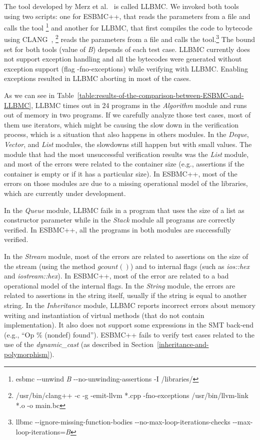 \documentclass[conference]{IEEEtran}
\begin{document}
The tool developed by Merz et al.~\cite{Florian12} is called LLBMC.
We invoked both tools using two scripts: one for ESBMC++, that reads
the parameters from a file and calls the tool%
\footnote[1]{esbmc -\/-unwind \textit{B}  -\/-no-unwinding-assertions -I /libraries/}
and another for LLBMC, that first compiles the code to bytecode using CLANG~\cite{CLANG},%
\footnote[2]{/usr/bin/clang++ -c -g -emit-llvm *.cpp -fno-exceptions \newline /usr/bin/llvm-link *.o -o main.bc}
reads the parameters from a file and calls the tool.\footnote[3]
{llbmc -\/-ignore-missing-function-bodies \newline -\/-no-max-loop-iterations-checks -\/-max-loop-iterations=\textit{B}}
The bound set for both tools (value of \textit{B}) depends of each test case.
LLBMC currently does not support exception handling and all the bytecodes were generated without
exception support (flag -fno-exceptions) while verifying with LLBMC.
Enabling exceptions resulted in LLBMC aborting in most of the cases.

As we can see in Table~\ref{table:results-of-the-comparison-between-ESBMC-and-LLBMC},
LLBMC times out in 24 programs in the \textit{Algorithm} module and
runs out of memory in two programs. If we carefully analyze those test cases,
most of them use iterators, which might be causing the slow down
in the verification process, which is a situation that also happens in others modules.
In the \textit{Deque}, \textit{Vector}, and \textit{List} modules,
the slowdowns still happen but with small values. The module that had the
most unsuccessful verification results was the \textit{List} module, and most of the
errors were related to the container size (e.g., assertions if the container
is empty or if it has a particular size). In ESBMC++, most of the errors on
those modules are due to a missing operational model
of the libraries, which are currently under development.

In the \textit{Queue} module, LLBMC fails in a program that uses the size of a list
as constructor parameter while in the \textit{Stack} module all programs are correctly verified.
In ESBMC++, all the programs in both modules are successfully verified.

In the \textit{Stream} module, most of the errors are related to assertions on the size
of the stream (using the method $gcount\left(\right)$) and to internal flags (such as
\textit{ios::hex} and \textit{iostream::hex}). In ESBMC++, most of the error are related
to a bad operational model of the internal flags. In the \textit{String} module, the errors are related
to assertions in the string itself, usually if the string is equal to another string.
In the \textit{Inheritance} module, LLBMC reports incorrect errors about memory writing and
instantiation of virtual methods (that do not contain implementation). 
It also does not support some expressions in the SMT back-end (e.g., 
``Op \% (nondef) found''). ESBMC++ fails to verify test cases related to the use of the
\textit{dynamic\_cast} (as described in Section~\ref{inheritance-and-polymorphism}).
\end{document}
